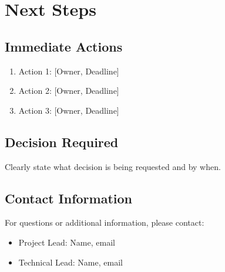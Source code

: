 \section{Next Steps}

\subsection{Immediate Actions}

\begin{enumerate}
    \item Action 1: [Owner, Deadline]
    \item Action 2: [Owner, Deadline]
    \item Action 3: [Owner, Deadline]
\end{enumerate}

\subsection{Decision Required}

\begin{keyinsight}
Clearly state what decision is being requested and by when.
\end{keyinsight}

\subsection{Contact Information}

For questions or additional information, please contact:

\begin{itemize}
    \item Project Lead: Name, email
    \item Technical Lead: Name, email
\end{itemize}
